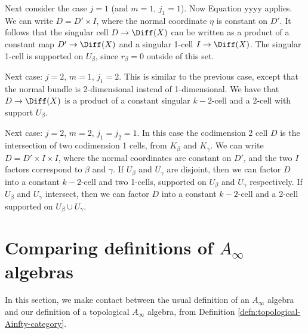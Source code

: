 \documentclass[11pt,leqno]{amsart}
\begin{document}
Next consider the case $j = 1$ (and $m=1$, $j_1=1$).
Now Equation yyyy applies.
We can write $D = D'\times I$, where the normal coordinate $\eta$ is constant on $D'$.
It follows that the singular cell $D \to \Diff(X)$ can be written as a product
of a constant map $D' \to \Diff(X)$ and a singular 1-cell $I \to \Diff(X)$.
The singular 1-cell is supported on $U_\beta$, since $r_\beta = 0$ outside of this set.

Next case: $j=2$, $m=1$, $j_1 = 2$.
This is similar to the previous case, except that the normal bundle is 2-dimensional instead of
1-dimensional.
We have that $D \to \Diff(X)$ is a product of a constant singular $k{-}2$-cell
and a 2-cell with support $U_\beta$.

Next case: $j=2$, $m=2$, $j_1 = j_2 = 1$.
In this case the codimension 2 cell $D$ is the intersection of two
codimension 1 cells, from $K_\beta$ and $K_\gamma$.
We can write $D = D' \times I \times I$, where the normal coordinates are constant
on $D'$, and the two $I$ factors correspond to $\beta$ and $\gamma$.
If $U_\beta$ and $U_\gamma$ are disjoint, then we can factor $D$ into a constant $k{-}2$-cell and
two 1-cells, supported on $U_\beta$ and $U_\gamma$ respectively.
If $U_\beta$ and $U_\gamma$ intersect, then we can factor $D$ into a constant $k{-}2$-cell and
a 2-cell supported on $U_\beta \cup U_\gamma$.





\section{Comparing definitions of $A_\infty$ algebras}
\label{sec:comparing-A-infty}
In this section, we make contact between the usual definition of an $A_\infty$ algebra and our definition of a topological $A_\infty$ algebra, from Definition \ref{defn:topological-Ainfty-category}.
\end{document}
